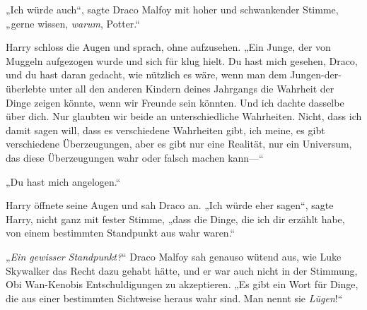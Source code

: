 „Ich würde auch“, sagte Draco Malfoy mit hoher und schwankender Stimme, „gerne wissen, \emph{warum}, Potter.“

Harry schloss die Augen und sprach, ohne aufzusehen.
„Ein Junge, der von Muggeln aufgezogen wurde und sich für klug hielt. Du hast mich gesehen, Draco, und du hast daran gedacht, wie nützlich es wäre, wenn man dem Jungen-der-überlebte unter all den anderen Kindern deines Jahrgangs die Wahrheit der Dinge zeigen könnte, wenn wir Freunde sein könnten. Und ich dachte dasselbe über dich. Nur glaubten wir beide an unterschiedliche Wahrheiten. Nicht, dass ich damit sagen will, dass es verschiedene Wahrheiten gibt, ich meine, es gibt verschiedene Überzeugungen, aber es gibt nur eine Realität, nur ein Universum, das diese Überzeugungen wahr oder falsch machen kann—“

„Du hast mich angelogen.“

Harry öffnete seine Augen und sah Draco an.
„Ich würde eher sagen“, sagte Harry, nicht ganz mit fester Stimme, „dass die Dinge, die ich dir erzählt habe, von einem bestimmten Standpunkt aus wahr waren.“

„\emph{Ein gewisser Standpunkt?}“
Draco Malfoy sah genauso wütend aus, wie Luke Skywalker das Recht dazu gehabt hätte, und er war auch nicht in der Stimmung, Obi Wan-Kenobis Entschuldigungen zu akzeptieren.
„Es gibt ein Wort für Dinge, die aus einer bestimmten Sichtweise heraus wahr sind. Man nennt sie \emph{Lügen}!“

